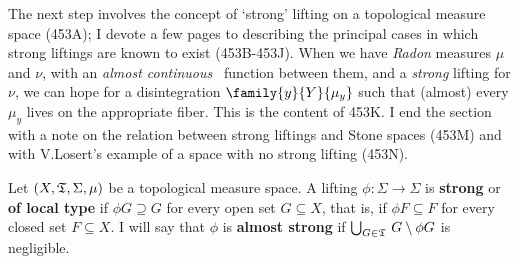       
\def\chaptername{Perfect measures, disintegrations and processes} 
\def\sectionname{Strong liftings} 
      
\def\undtheta{\underline{\theta}} 
\def\undphi{\underline{\phi}} 
\def\undpsi{\underline{\psi}} 
\def\lti{left-\vthsp translation-\vthsp invariant} 
      
      
The next step involves the concept of `strong' lifting on a 
topological measure space (453A);  I devote a few pages to describing 
the principal cases in which strong liftings are known to exist 
(453B-453J).   When we have {\it Radon} measures $\mu$ and $\nu$, with 
an {\it almost continuous} \imp\ function between them, and a {\it 
strong} lifting for $\nu$, we 
can hope for a disintegration $\family{y}{Y}{\mu_y}$ such that (almost) 
every $\mu_y$ lives on the appropriate fiber.   This is 
the content of 453K.   I end the section with a note on the relation 
between strong liftings and Stone spaces (453M) and with V.Losert's 
example of a space with no strong lifting (453N). 
      
      
 Let $(X,\frak T,\Sigma,\mu)$ be a topological 
measure space.   A lifting $\phi:\Sigma\to\Sigma$ is {\bf strong} or 
{\bf of local type} if $\phi G\supseteq G$ for every open set 
$G\subseteq X$, that is, if $\phi F\subseteq F$ for every closed set 
$F\subseteq X$.   I will say that $\phi$ is {\bf almost strong} if 
$\bigcup_{G\in\frak T}\,G\setminus\phi G$ is negligible. 
      
